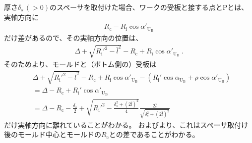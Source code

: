 \clearpage
厚さ$\delta_s\,(>0)$のスペーサを取付けた場合、ワークの受板と接する点と\TableCenter Pとは、実軸方向に
\begin{align*}
  R_\mathrm c-R_\mathrm i\cos\alpha'_{\mathrm U_\mathrm B}
\end{align*}
だけ差があるので、その実軸方向の位置は、
\begin{align*}
  \Delta+\sqrt{R_\mathrm i'^2-\bar l^2}-R_\mathrm c+R_\mathrm i\cos\alpha'_{\mathrm U_\mathrm B}\ .
\end{align*}
そのためより、モールドと（ボトム側の）受板は
\begin{align*}
  &  \Delta+\sqrt{R_\mathrm i'^2-\bar l^2}-R_\mathrm c+R_\mathrm i\cos\alpha'_{\mathrm U_\mathrm B}
     -\left(R_\mathrm i'\cos\alpha_{\mathrm U_\mathrm B}+\rho\cos\alpha'_{\mathrm U_\mathrm B}\right)\\
  &= \Delta-R_\mathrm c+R_\mathrm i'\cos\alpha'_{\mathrm U_\mathrm B}\\
  &= \Delta-R_\mathrm c
     -\frac{\delta_s}2+\sqrt{R_\mathrm i'^2-\frac{\delta_s^2+(2\bar l)^2}4}\frac{2\bar l}{\sqrt{\delta_s^2+(2\bar l)^2}}
\end{align*}
だけ実軸方向に離れていることがわかる。
およびより、これはスペーサ取付け後のモールド中心とモールドの\CenterCurvature$R_\mathrm c$との差であることがわかる。
